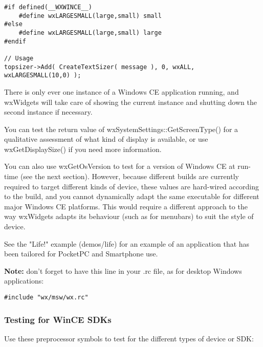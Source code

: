 \begin{verbatim}
#if defined(__WXWINCE__)
    #define wxLARGESMALL(large,small) small
#else
    #define wxLARGESMALL(large,small) large
#endif

// Usage
topsizer->Add( CreateTextSizer( message ), 0, wxALL, wxLARGESMALL(10,0) );
\end{verbatim}

There is only ever one instance of a Windows CE application running,
and wxWidgets will take care of showing the current instance and
shutting down the second instance if necessary.

You can test the return value of wxSystemSettings::GetScreenType()
for a qualitative assessment of what kind of display is available,
or use wxGetDisplaySize() if you need more information.

You can also use wxGetOsVersion to test for a version of Windows CE at
run-time (see the next section). However, because different builds
are currently required to target different kinds of device, these
values are hard-wired according to the build, and you cannot
dynamically adapt the same executable for different major Windows CE
platforms. This would require a different approach to the way
wxWidgets adapts its behaviour (such as for menubars) to suit the
style of device.

See the "Life!" example (demos/life) for an example of
an application that has been tailored for PocketPC and Smartphone use.

{\bf Note:} don't forget to have this line in your .rc file, as for
desktop Windows applications:

\begin{verbatim}
#include "wx/msw/wx.rc"
\end{verbatim}

\subsubsection{Testing for WinCE SDKs}

Use these preprocessor symbols to test for the different types of device or SDK:

\begin{twocollist}\itemsep=0pt
\end{twocollist}

